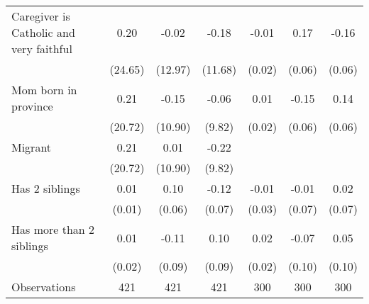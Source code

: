 {\begin{tabular}{l*{6}{c}}
\addlinespace
Caregiver is Catholic and very faithful&        0.20         &       -0.02         &       -0.18         &       -0.01         &        0.17\sym{**} &       -0.16\sym{*}  \\
                    &     (24.65)         &     (12.97)         &     (11.68)         &      (0.02)         &      (0.06)         &      (0.06)         \\
\addlinespace
Mom born in province&        0.21         &       -0.15         &       -0.06         &        0.01         &       -0.15\sym{*}  &        0.14\sym{*}  \\
                    &     (20.72)         &     (10.90)         &      (9.82)         &      (0.02)         &      (0.06)         &      (0.06)         \\
\addlinespace
Migrant         &        0.21         &        0.01         &       -0.22         &                     &                     &                     \\
                    &     (20.72)         &     (10.90)         &      (9.82)         &                     &                     &                     \\
\addlinespace
Has 2 siblings      &        0.01         &        0.10         &       -0.12         &       -0.01         &       -0.01         &        0.02         \\
                    &      (0.01)         &      (0.06)         &      (0.07)         &      (0.03)         &      (0.07)         &      (0.07)         \\
\addlinespace
Has more than 2 siblings&        0.01         &       -0.11         &        0.10         &        0.02         &       -0.07         &        0.05         \\
                    &      (0.02)         &      (0.09)         &      (0.09)         &      (0.02)         &      (0.10)         &      (0.10)         \\
\midrule
Observations        &         421         &         421         &         421         &         300         &         300         &         300         \\
\bottomrule
\end{tabular}
}
